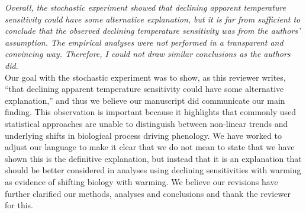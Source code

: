 \documentclass[11pt]{article}
\begin{document}
\emph{Overall, the stochastic experiment showed that declining apparent temperature sensitivity could have some alternative explanation, but it is far from sufficient to conclude that the observed declining temperature sensitivity was from the authors' assumption. The empirical analyses were not performed in a transparent and convincing way. Therefore, I could not draw similar conclusions as the authors did.}\\

Our goal with the stochastic experiment was to show, as this reviewer writes, ``that declining apparent temperature sensitivity could have some alternative explanation,'' and thus we believe our manuscript did communicate our main finding. This observation is important because it highlights that commonly used statistical approaches are unable to distinguish between non-linear trends and underlying shifts in biological process driving phenology. We have worked to adjust our language to make it clear that we do not mean to state that we have shown this is the definitive explanation, but instead that it is an explanation that should be better considered in analyses using declining sensitivities with warming as evidence of shifting biology with warming. We believe our revisions have further clarified our methods, analyses and conclusions and thank the reviewer for this.



\end{document}
